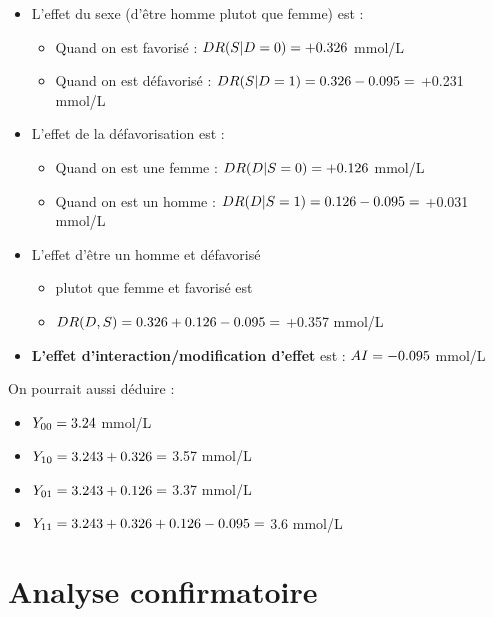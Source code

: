\documentclass[
]{book}
\providecommand{\tightlist}{%
  \setlength{\itemsep}{0pt}\setlength{\parskip}{0pt}}
\begin{document}
\begin{itemize}
\tightlist
\item
  L'effet du sexe (d'être homme plutot que femme) est :

  \begin{itemize}
  \tightlist
  \item
    Quand on est favorisé : \(\small DR(S|D=0) = +0.326\) mmol/L
  \item
    Quand on est défavorisé : \(\small DR(S|D=1) = 0.326 - 0.095 =\) +0.231 mmol/L
  \end{itemize}
\item
  L'effet de la défavorisation est :

  \begin{itemize}
  \tightlist
  \item
    Quand on est une femme : \(\small DR(D|S=0) = +0.126\) mmol/L
  \item
    Quand on est un homme : \(\small DR(D|S=1) = 0.126 - 0.095 =\) +0.031 mmol/L
  \end{itemize}
\item
  L'effet d'être un homme et défavorisé

  \begin{itemize}
  \tightlist
  \item
    plutot que femme et favorisé est
  \item
    \(\small DR(D,S) = 0.326 + 0.126 - 0.095 =\) +0.357 mmol/L
  \end{itemize}
\item
  \textbf{L'effet d'interaction/modification d'effet} est : \(\small AI = -0.095\) mmol/L
\end{itemize}

On pourrait aussi déduire :

\begin{itemize}
\tightlist
\item
  \(\small Y_{00} = 3.24\) mmol/L
\item
  \(\small Y_{10} = 3.243 + 0.326 =\) 3.57 mmol/L
\item
  \(\small Y_{01} = 3.243 + 0.126 =\) 3.37 mmol/L
\item
  \(\small Y_{11} = 3.243 + 0.326 + 0.126 - 0.095 =\) 3.6 mmol/L
\end{itemize}

\hypertarget{analyse-confirmatoire}{%
\section{Analyse confirmatoire}\label{analyse-confirmatoire}}
\end{document}
